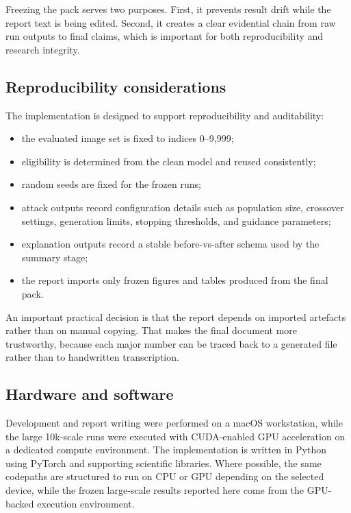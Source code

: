 Freezing the pack serves two purposes. First, it prevents result drift while the report text is
being edited. Second, it creates a clear evidential chain from raw run outputs to final claims,
which is important for both reproducibility and research integrity.

\subsection{Reproducibility considerations}
The implementation is designed to support reproducibility and auditability:
\begin{itemize}
  \item the evaluated image set is fixed to indices 0--9{,}999;
  \item eligibility is determined from the clean model and reused consistently;
  \item random seeds are fixed for the frozen runs;
  \item attack outputs record configuration details such as population size, crossover settings,
  generation limits, stopping thresholds, and guidance parameters;
  \item explanation outputs record a stable before-vs-after schema used by the summary stage;
  \item the report imports only frozen figures and tables produced from the final pack.
\end{itemize}

An important practical decision is that the report depends on imported artefacts rather than on
manual copying. That makes the final document more trustworthy, because each major number can
be traced back to a generated file rather than to handwritten transcription.

\subsection{Hardware and software}
Development and report writing were performed on a macOS workstation, while the large 10k-scale
runs were executed with CUDA-enabled GPU acceleration on a dedicated compute environment. The
implementation is written in Python using PyTorch and supporting scientific libraries. Where
possible, the same codepaths are structured to run on CPU or GPU depending on the selected
device, while the frozen large-scale results reported here come from the GPU-backed execution
environment.
